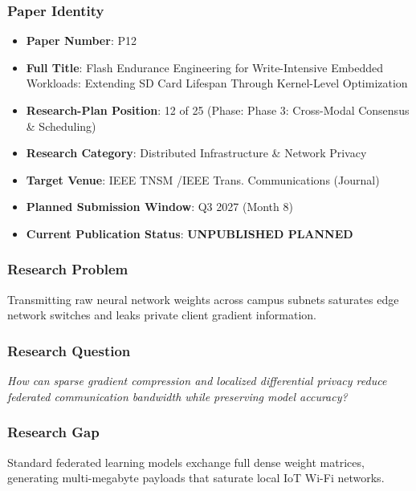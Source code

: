 \documentclass[11pt,letterpaper]{article}
\begin{document}
\subsubsection{Paper Identity}
\begin{itemize}[leftmargin=*]
    \item \textbf{Paper Number}: P12
    \item \textbf{Full Title}: Flash Endurance Engineering for Write-\allowbreak Intensive Embedded Workloads: Extending SD Card Lifespan Through Kernel-\allowbreak Level Optimization
    \item \textbf{Research-Plan Position}: 12 of 25 (Phase: Phase 3: Cross-\allowbreak Modal Consensus \& Scheduling)
    \item \textbf{Research Category}: Distributed Infrastructure \& Network Privacy
    \item \textbf{Target Venue}: IEEE TNSM /\allowbreak  IEEE Trans. Communications (Journal)
    \item \textbf{Planned Submission Window}: Q3 2027 (Month 8)
    \item \textbf{Current Publication Status}: \textbf{UNPUBLISHED PLANNED}
\end{itemize}

\subsubsection{Research Problem}
Transmitting raw neural network weights across campus subnets saturates edge network switches and leaks private client gradient information.

\subsubsection{Research Question}
\begin{tcolorbox}[colback=blue!3!white,colframe=blue!50!black,title=Primary Scientific Question]
\textit{How can sparse gradient compression and localized differential privacy reduce federated communication bandwidth while preserving model accuracy?}
\end{tcolorbox}

\subsubsection{Research Gap}
Standard federated learning models exchange full dense weight matrices, generating multi-\allowbreak megabyte payloads that saturate local IoT Wi-\allowbreak Fi networks.
\end{document}
